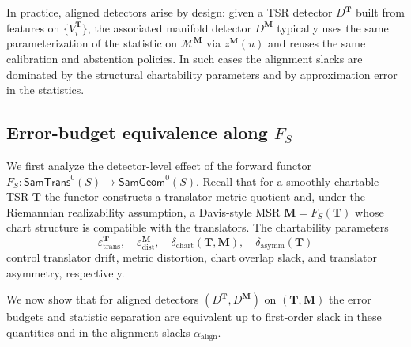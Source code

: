 \documentclass[11pt]{article}
\newcommand{\SamTrans}{\mathsf{SamTrans}}
\newcommand{\SamGeom}{\mathsf{SamGeom}}
\begin{document}
In practice, aligned detectors arise by design: given a TSR detector
$D^{\mathbf{T}}$ built from features on $\{V_i^{\mathbf{T}}\}$, the
associated manifold detector $D^{\mathbf{M}}$ typically uses the same
parameterization of the statistic on $\mathcal{M}^{\mathbf{M}}$ via
$z^{\mathbf{M}}(u)$ and reuses the same calibration and abstention
policies.  In such cases the alignment slacks are dominated by the
structural chartability parameters and by approximation error in the
statistics.

\subsection{Error-budget equivalence along \texorpdfstring{$F_S$}{F\_S}}
\label{subsec:error-transfer-F}

We first analyze the detector-level effect of the forward functor
$F_S : \SamTrans^0(S) \to \SamGeom^0(S)$.  Recall that for a smoothly
chartable TSR $\mathbf{T}$ the functor constructs a translator metric
quotient and, under the Riemannian realizability assumption, a Davis-style
MSR $\mathbf{M} = F_S(\mathbf{T})$ whose chart structure is compatible
with the translators.  The chartability parameters
\[
\varepsilon_{\mathrm{trans}}^{\mathbf{T}},
\quad
\varepsilon_{\mathrm{dist}}^{\mathbf{M}},
\quad
\delta_{\mathrm{chart}}(\mathbf{T}, \mathbf{M}),
\quad
\delta_{\mathrm{asymm}}(\mathbf{T})
\]
control translator drift, metric distortion, chart overlap slack, and
translator asymmetry, respectively.

We now show that for aligned detectors $(D^{\mathbf{T}}, D^{\mathbf{M}})$
on $(\mathbf{T}, \mathbf{M})$ the error budgets and statistic separation
are equivalent up to first-order slack in these quantities and in the
alignment slacks $\alpha_{\mathrm{align}}$.
\end{document}
